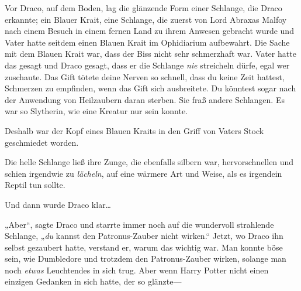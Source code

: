 Vor Draco, auf dem Boden, lag die glänzende Form einer Schlange, die Draco erkannte; ein Blauer Krait, eine Schlange, die zuerst von Lord Abraxas Malfoy nach einem Besuch in einem fernen Land zu ihrem Anwesen gebracht wurde und Vater hatte seitdem einen Blauen Krait im Ophidiarium aufbewahrt. Die Sache mit dem Blauen Krait war, dass der Biss nicht sehr schmerzhaft war. Vater hatte das gesagt und Draco gesagt, dass er die Schlange \emph{nie} streicheln dürfe, egal wer zuschaute. Das Gift tötete deine Nerven so schnell, dass du keine Zeit hattest, Schmerzen zu empfinden, wenn das Gift sich ausbreitete. Du könntest sogar nach der Anwendung von Heilzaubern daran sterben. Sie fraß andere Schlangen. Es war so Slytherin, wie eine Kreatur nur sein konnte.

Deshalb war der Kopf eines Blauen Kraits in den Griff von Vaters Stock geschmiedet worden.

Die helle Schlange ließ ihre Zunge, die ebenfalls silbern war, hervorschnellen und schien irgendwie zu \emph{lächeln}, auf eine wärmere Art und Weise, als es irgendein Reptil tun sollte.

Und dann wurde Draco klar…

„Aber“, sagte Draco und starrte immer noch auf die wundervoll strahlende Schlange, „\emph{du} kannst den Patronus-Zauber nicht wirken.“ Jetzt, wo Draco ihn selbst gezaubert hatte, verstand er, warum das wichtig war. Man konnte böse sein, wie Dumbledore und trotzdem den Patronus-Zauber wirken, solange man noch \emph{etwas} Leuchtendes in sich trug.
Aber wenn Harry Potter nicht einen einzigen Gedanken in sich hatte, der so glänzte—

